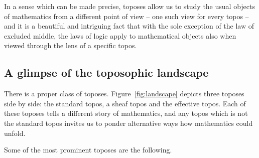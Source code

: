 \documentclass[oneside,reqno]{amsart}
\theoremstyle{definition}
\theoremstyle{plain}
\theoremstyle{remark}
\renewcommand{\_}{\mathpunct{.}\,}
\newcommand{\effective}{ef{}fective\xspace}
\newcommand{\?}{\,{:}\,}
\begin{document}
In a sense which can be made precise, toposes allow us to study the usual
objects of mathematics from a different point of view -- one such view for
every topos -- and it is a beautiful and intriguing fact that with the sole
exception of the law of excluded middle, the laws of logic apply to
mathematical objects also when viewed through the lens of a specific topos.


\subsection{A glimpse of the toposophic landscape}
There is a proper class of toposes. Figure~\ref{fig:landscape} depicts three
toposes side by side: the standard topos, a sheaf topos and the \effective
topos. Each of these toposes tells a different story of mathematics, and any
topos which is not the standard topos invites us to ponder alternative ways how
mathematics could unfold.

Some of the most prominent toposes are the following.
\end{document}
